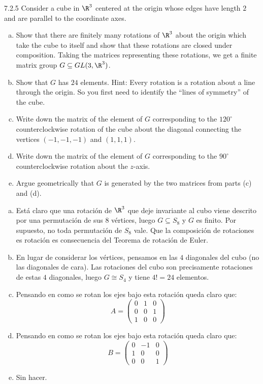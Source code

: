 \documentclass[twoside]{article}
\begin{document}
\begin{ejercicio}{7.2.5}
Consider a cube in $\R^3$ centered at the origin whose edges have length $2$ and are parallel to the coordinate axes.
\begin{enumerate}[a.]
\item Show that there are finitely many rotations of $\R^3$ about the origin which take the cube to itself and show that these rotations are closed under composition.
Taking the matrices representing these rotations, we get a finite matrix group $G \subseteq GL(3, \R^3)$.
\item Show that $G$ has $24$ elements.
Hint: Every rotation is a rotation about a line through the origin.
So you first need to identify the “lines of symmetry” of the cube. 
\item Write down the matrix of the element of $G$ corresponding to the $120^{\circ}$ counterclockwise rotation of the cube about the diagonal connecting the vertices $(-1, -1, -1)$ and $(1, 1, 1)$. 
\item Write down the matrix of the element of $G$ corresponding to the $90^{\circ}$ counterclockwise rotation about the $z$-axis.
\item Argue geometrically that $G$ is generated by the two matrices from parts (c) and (d).
\end{enumerate}
\end{ejercicio}
\begin{solucion}
\begin{enumerate}[a.]
\item Está claro que una rotación de $\R^3$ que deje invariante al cubo viene descrito por una permutación de sus $8$ vértices, luego $G \subseteq S_8$ y $G$ es finito.
Por supuesto, no toda permutación de $S_8$ vale.
Que la composición de rotaciones es rotación es consecuencia del Teorema de rotación de Euler.

\item En lugar de considerar los vértices, pensamos en las $4$ diagonales del cubo (no las diagonales de cara).
Las rotaciones del cubo son precisamente rotaciones de estas $4$ diagonales, luego $G \cong S_4$ y tiene $4!=24$ elementos.

\item Pensando en como se rotan los ejes bajo esta rotación queda claro que:
\[ A = \begin{pmatrix}0 & 1 & 0\\0 & 0 & 1\\1 & 0 & 0\end{pmatrix} \]

\item Pensando en como se rotan los ejes bajo esta rotación queda claro que:
\[ B = \begin{pmatrix}0 & -1 & 0\\1 & 0 & 0\\0 & 0 & 1\end{pmatrix} \]

\item Sin hacer.
\end{enumerate}
\end{solucion}
\newpage
\end{document}
